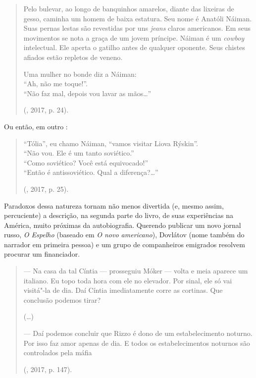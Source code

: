 \begin{quotation}
Pelo bulevar, ao longo de banquinhos amarelos, diante das lixeiras de
gesso, caminha um homem de baixa estatura. Seu nome é Anatóli Náiman.
Suas pernas lestas são revestidas por uns \emph{jeans} claros americanos. Em seus
movimentos se nota a graça de um jovem príncipe. Náiman é um \emph{cowboy}
intelectual. Ele aperta o gatilho antes de qualquer oponente. Seus 
chistes afiados estão repletos de veneno.\\



\noindent{}Uma mulher no bonde diz a Náiman: \\
``Ah, não me toque!''. \\
``Não faz mal, depois vou lavar as mãos\ldots{}''

(, 2017, p. 24).

\end{quotation}

Ou então, em outro :

\begin{quotation}
\noindent{}``Tólia'', eu chamo Náiman, ``vamos visitar Liova Rýskin''. \\
``Não vou. Ele é um  tanto soviético.'' \\
``Como soviético? Você está equivocado!'' \\
``Então é antissoviético. Qual a diferença?\ldots{}''

(, 2017, p. 25).

\end{quotation}

Paradoxos dessa natureza tornam não menos divertida (e, mesmo assim,
 percuciente) a descrição, na segunda parte do livro, de suas 
experiências na América, muito próximas da autobiografia. Querendo
publicar um novo jornal russo, \emph{O Espelho} (baseado em \emph{O novo
 americano}), Dovlátov (nome também do narrador em primeira pessoa) e um grupo de
companheiros emigrados resolvem procurar um financiador.

\begin{quotation}
--- Na casa da tal Cíntia --- prosseguiu Móker --- volta e meia aparece um italiano. Eu topo toda hora com ele no elevador. Por sinal, ele só vai visitá"-la de dia. Daí Cíntia imediatamente corre as cortinas. Que conclusão podemos tirar?

(\ldots{})

--- Daí podemos concluir que Rizzo é dono de um estabelecimento noturno. Por isso faz amor apenas de dia. E todos os estabelecimentos noturnos são controlados pela máfia

(, 2017, p. 147).
\end{quotation}

